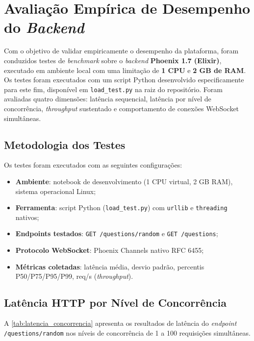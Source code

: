 \documentclass[
	12pt,
	openany,
	oneside,
	a4paper,
	english,
	brazil
]{abntex2}
\begin{document}
\section{Avaliação Empírica de Desempenho do \textit{Backend}}\label{sec:desempenho}

Com o objetivo de validar empiricamente o desempenho da plataforma, foram conduzidos testes de \textit{benchmark} sobre o \textit{backend} \textbf{Phoenix 1.7 (Elixir)}, executado em ambiente local com uma limitação de \textbf{1 CPU} e \textbf{2 GB de RAM}. Os testes foram executados com um script Python desenvolvido especificamente para este fim, disponível em \texttt{load\_test.py} na raiz do repositório. Foram avaliadas quatro dimensões: latência sequencial, latência por nível de concorrência, \textit{throughput} sustentado e comportamento de conexões WebSocket simultâneas.

\subsection{Metodologia dos Testes}

Os testes foram executados com as seguintes configurações:

\begin{itemize}
  \item \textbf{Ambiente}: notebook de desenvolvimento (1 CPU virtual, 2 GB RAM), sistema operacional Linux;
  \item \textbf{Ferramenta}: script Python (\texttt{load\_test.py}) com \texttt{urllib} e \texttt{threading} nativos;
  \item \textbf{Endpoints testados}: \texttt{GET /questions/random} e \texttt{GET /questions};
  \item \textbf{Protocolo WebSocket}: Phoenix Channels nativo RFC 6455;
  \item \textbf{Métricas coletadas}: latência média, desvio padrão, percentis P50/P75/P95/P99, req/s (\textit{throughput}).
\end{itemize}

\subsection{Latência HTTP por Nível de Concorrência}\label{sec:des_phoenix}

A \autoref{tab:latencia_concorrencia} apresenta os resultados de latência do \textit{endpoint} \texttt{/questions/random} nos níveis de concorrência de 1 a 100 requisições simultâneas.
\end{document}
